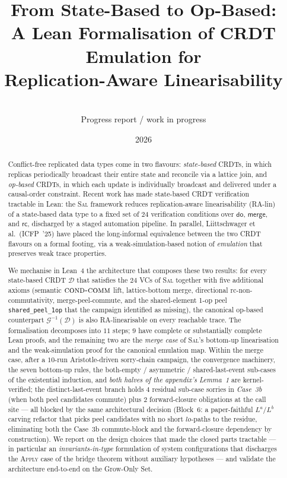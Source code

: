 \documentclass[11pt,a4paper]{article}
\title{From State-Based to Op-Based:\\
  A Lean Formalisation of CRDT Emulation for\\
  Replication-Aware Linearisability}
\author{\\[-1em]\small Progress report / work in progress}
\date{2026}
\theoremstyle{definition}
\theoremstyle{remark}
\newcommand{\RDT}{\ensuremath{\mathcal{D}}}
\newcommand{\mdo}{\mathsf{do}}
\newcommand{\mmerge}{\mathsf{merge}}
\newcommand{\mrc}{\mathsf{rc}}
\newcommand{\Sal}{\textsc{Sal}}
\newcommand{\Emul}{\mathcal{G}}
\begin{document}
\maketitle

\begin{abstract}
  Conflict-free replicated data types come in two flavours:
  \emph{state-based} CRDTs, in which replicas periodically broadcast
  their entire state and reconcile via a lattice join, and
  \emph{op-based} CRDTs, in which each update is individually broadcast
  and delivered under a causal-order constraint. Recent work has made
  state-based CRDT verification tractable in Lean: the \Sal{}
  framework reduces replication-aware linearisability (RA-lin) of a
  state-based data type to a fixed set of $24$ verification
  conditions over $\mdo$, $\mmerge$, and $\mrc$, discharged by a staged
  automation pipeline. In parallel, Liittschwager et al.\ (ICFP~'25)
  have placed the long-informal equivalence between the two CRDT
  flavours on a formal footing, via a weak-simulation-based notion of
  \emph{emulation} that preserves weak trace properties.

  We mechanise in Lean~4 the architecture that composes these two
  results: for every state-based CRDT $\RDT$ that satisfies the
  $24$ VCs of \Sal{} together with five additional axioms
  (semantic $\textsc{cond-comm}$ lift, lattice-bottom merge,
  directional rc-non-commutativity, merge-peel-commute, and the
  shared-element 1-op peel \texttt{shared\_peel\_1op} that the
  campaign identified as missing), the canonical op-based
  counterpart $\Emul^{-1}(\RDT)$ is also RA-linearisable on every
  reachable trace. The formalisation decomposes into $11$ steps;
  $9$ have complete or substantially complete Lean proofs, and the
  remaining two are the \emph{merge case} of \Sal{}'s bottom-up
  linearisation and the weak-simulation proof for the canonical
  emulation map. Within the merge case, after a $10$-run
  Aristotle-driven sorry-chain campaign, the convergence
  machinery, the seven bottom-up rules, the both-empty /
  asymmetric / shared-last-event sub-cases of the existential
  induction, and \emph{both halves of the appendix's
  Lemma~1} are kernel-verified; the distinct-last-event branch
  holds $4$ residual sub-case sorries in \emph{Case~3b} (when both
  peel candidates commute) plus $2$ forward-closure obligations
  at the call site --- all blocked by the same architectural
  decision (Block~6: a paper-faithful $L^a / L^b$ carving
  refactor that picks peel candidates with no short
  $\mathit{lo}$-paths to the residue, eliminating both the
  Case~3b commute-block and the forward-closure dependency by
  construction). We report on the design choices that made the
  closed parts tractable --- in particular an
  \emph{invariants-in-type} formulation of system configurations
  that discharges the \textsc{Apply} case of the bridge theorem
  without auxiliary hypotheses --- and validate the architecture
  end-to-end on the Grow-Only Set.
\end{abstract}
\end{document}
